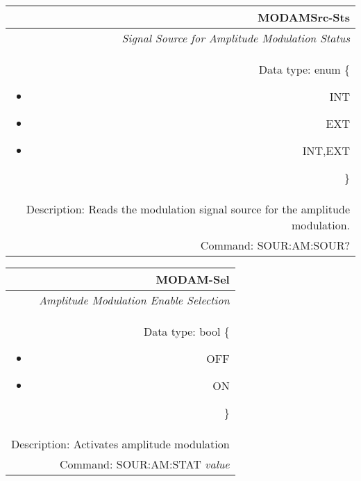 \documentclass[openany]{article}
\begin{document}
		\begin{tabular}{N}
			\hline
			\bfseries MODAMSrc-Sts \\ \hline
			\emph{Signal Source for Amplitude Modulation Status} \\
			Data type: enum \{\begin{itemize}[noitemsep]
				\small
				\item[] INT
				\item[] EXT
				\item[] INT,EXT
			\end{itemize}\} \\ 
			Description: Reads the modulation signal source for the amplitude modulation. \\
			Command: SOUR:AM:SOUR? \\

		\end{tabular}
%
		\begin{tabular}{N}
			\hline
			\bfseries MODAM-Sel \\ \hline
			\emph{Amplitude Modulation Enable Selection} \\
			Data type: bool \{\begin{itemize}[noitemsep]
				\small
				\item[] OFF
				\item[] ON
			\end{itemize}\} \\
			Description: Activates amplitude modulation\\
			Command: SOUR:AM:STAT \emph{value} \\

		\end{tabular}
\end{document}
